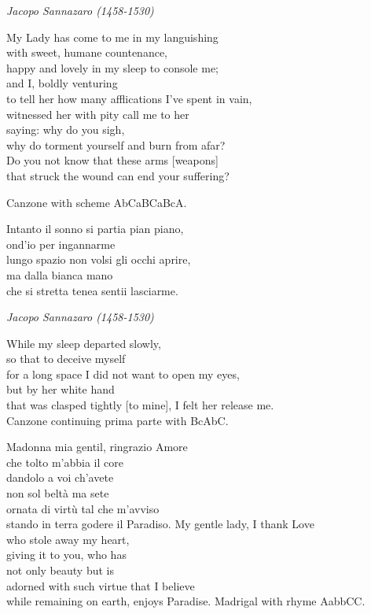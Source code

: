 \documentclass[12pt, twocolumn]{text-translation}
\begin{document}
{\raggedleft \textit{Jacopo Sannazaro (1458-1530)}\par}
\poemasterisks
My Lady has come to me in my languishing  \\
with sweet, humane countenance, \\
happy and lovely in my sleep to console me;  \\
and I, boldly venturing  \\
to tell her how many afflications I've spent in vain, \\
witnessed her with pity call me to her \\
saying: why do you sigh, \\
why do torment yourself and burn from afar? \\
Do you not know that these arms [weapons] \\
that struck the wound can end your suffering? 

Canzone with scheme AbCaBCaBcA.

Intanto il sonno si partia pian piano,  \\
ond'io per ingannarme  \\
lungo spazio non volsi gli occhi aprire,  \\
ma dalla bianca mano  \\
che si stretta tenea sentii lasciarme. 

{\raggedleft \textit{Jacopo Sannazaro (1458-1530)}\par}
\poemasterisks
While my sleep departed slowly,  \\
so that to deceive myself  \\
for a long space I did not want to open my eyes,  \\
but by her white hand  \\
that was clasped tightly [to mine], I felt her release me.  \\

Canzone continuing prima parte with BcAbC.

Madonna mia gentil, ringrazio Amore  \\
che tolto m'abbia il core \\
dandolo a voi ch'avete \\
non sol beltà ma sete  \\
ornata di virtù tal che m'avviso \\
stando in terra godere il Paradiso.
\poemasterisks
My gentle lady, I thank Love \\
who stole away my heart, \\
giving it to you, who has \\
not only beauty but is \\
adorned with such virtue that I believe \\
while remaining on earth, enjoys Paradise. 
Madrigal with rhyme AabbCC.
\end{document}
